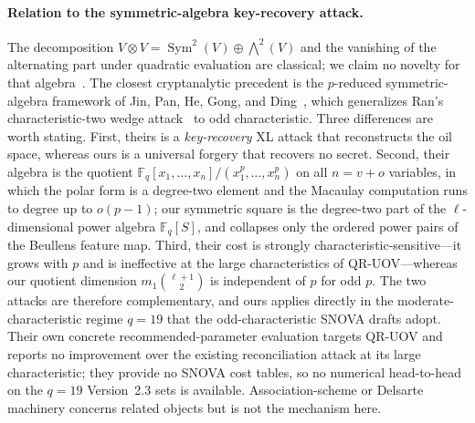 \documentclass[11pt]{article}
\newcommand{\F}{\mathbb F}
\newcommand{\Sym}{\operatorname{Sym}}
\newcommand{\SNOVA}{\textsf{SNOVA}}
\newcommand{\QRUOV}{\textsf{QR-UOV}}
\begin{document}
\paragraph{Relation to the symmetric-algebra key-recovery attack.}
The decomposition
$V\otimes V=\Sym^2(V)\oplus\bigwedge^2(V)$ and the vanishing of the alternating
part under quadratic evaluation are classical; we claim no novelty for that
algebra~\cite{Lam2005}.  The closest cryptanalytic precedent is the
$p$-reduced symmetric-algebra framework of Jin, Pan, He, Gong, and
Ding~\cite{JinEtAl2026}, which generalizes Ran's characteristic-two wedge
attack~\cite{Ran2026} to odd characteristic.  Three differences are worth
stating.  First, theirs is a \emph{key-recovery} XL attack that reconstructs the
oil space, whereas ours is a universal forgery that recovers no secret.  Second,
their algebra is the quotient $\F_q[x_1,\dots,x_n]/(x_1^p,\dots,x_n^p)$ on all
$n=v+o$ variables, in which the polar form is a degree-two element and the
Macaulay computation runs to degree up to $o(p-1)$; our symmetric square is the
degree-two part of the $\ell$-dimensional power algebra $\F_q[S]$, and collapses
only the ordered power pairs of the Beullens feature map.  Third, their cost is
strongly characteristic-sensitive---it grows with $p$ and is ineffective at the
large characteristics of \QRUOV{}---whereas our quotient dimension
$m_1\binom{\ell+1}{2}$ is independent of $p$ for odd $p$.  The two attacks are
therefore complementary, and ours applies directly in the moderate-characteristic
regime $q=19$ that the odd-characteristic \SNOVA{} drafts adopt.  Their own
concrete recommended-parameter evaluation targets \QRUOV{} and reports no
improvement over the existing reconciliation attack at its large characteristic;
they provide no \SNOVA{} cost tables, so no numerical head-to-head on the $q=19$
Version~2.3 sets is available.  Association-scheme or Delsarte machinery concerns
related objects but is not the mechanism here.
\end{document}
